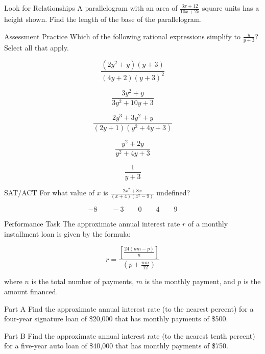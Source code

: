 \documentclass{article}
\newenvironment{practice}[2]{}{}        %
\newcommand{\answer}[1]{}               %
\begin{document}
\begin{practice}{37}{2}
Look for Relationships A parallelogram with an area of \(\frac{3x+12}{10x+25}\) square units has a height shown. Find the length of the base of the parallelogram.


\answer{The length of the base of the parallelogram is \(\frac{3}{5}\) units.}
\end{practice}

\begin{practice}{38}{2}
Assessment Practice Which of the following rational expressions simplify to \(\frac{y}{y+3}\)? Select all that apply.

\[
\frac{(2y^2+y)(y+3)}{(4y+2)(y+3)^2}
\]

\[
\frac{3y^2+y}{3y^2+10y+3}
\]

\[
\frac{2y^3+3y^2+y}{(2y+1)(y^2+4y+3)}
\]

\[
\frac{y^2+2y}{y^2+4y+3}
\]

\[
\frac{1}{y+3}
\]

\answer{\(\frac{3y^2+y}{3y^2+10y+3}\) and \(\frac{2y^3+3y^2+y}{(2y+1)(y^2+4y+3)}\)}
\end{practice}

\begin{practice}{39}{1}
SAT/ACT For what value of \(x\) is \(\frac{2x^2+8x}{(x+4)(x^2-9)}\) undefined?

\[
-8 \qquad -3 \qquad 0 \qquad 4 \qquad 9
\]

\answer{\(-3\)}
\end{practice}

\begin{practice}{40}{2}
Performance Task The approximate annual interest rate \(r\) of a monthly installment loan is given by the formula:

\[
r=\frac{\left[\frac{24(nm-p)}{n}\right]}{\left(p+\frac{nm}{12}\right)}
\]

where \(n\) is the total number of payments, \(m\) is the monthly payment, and \(p\) is the amount financed.

Part A Find the approximate annual interest rate (to the nearest percent) for a four-year signature loan of \$20{,}000 that has monthly payments of \$500.

Part B Find the approximate annual interest rate (to the nearest tenth percent) for a five-year auto loan of \$40{,}000 that has monthly payments of \$750.

\answer{Part A \(9\%\). Part B \(4.6\%\).}
\end{practice}
\end{document}
